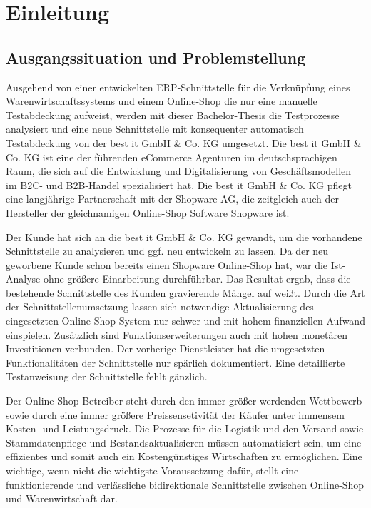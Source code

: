 \section{Einleitung}
\subsection{Ausgangssituation und Problemstellung}
Ausgehend von einer entwickelten ERP-Schnittstelle für die Verknüpfung eines Warenwirtschaftssystems und einem Online-Shop die nur eine manuelle Testabdeckung aufweist, werden mit dieser Bachelor-Thesis die Testprozesse analysiert und eine neue Schnittstelle mit konsequenter automatisch Testabdeckung von der best it GmbH \& Co. KG umgesetzt. Die best it GmbH \& Co. KG ist eine der führenden eCommerce Agenturen im deutschsprachigen Raum, die sich auf die Entwicklung und Digitalisierung von Geschäftsmodellen im B2C- und B2B-Handel spezialisiert hat. Die best it GmbH \& Co. KG pflegt eine langjährige Partnerschaft mit der Shopware AG, die zeitgleich auch der Hersteller der gleichnamigen Online-Shop Software Shopware ist. 

Der Kunde hat sich an die best it GmbH \& Co. KG gewandt, um die vorhandene Schnittstelle zu analysieren und ggf. neu entwickeln zu lassen. Da der neu geworbene Kunde schon bereits einen Shopware Online-Shop hat, war die Ist-Analyse ohne größere Einarbeitung durchführbar. Das Resultat ergab, dass die bestehende Schnittstelle des Kunden gravierende Mängel auf weißt. Durch die Art der Schnittstellenumsetzung lassen sich notwendige Aktualisierung des eingesetzten Online-Shop System nur schwer und mit hohem finanziellen Aufwand einspielen. Zusätzlich sind Funktionserweiterungen auch mit hohen monetären Investitionen verbunden. Der vorherige Dienstleister hat die umgesetzten Funktionalitäten der Schnittstelle nur spärlich dokumentiert. Eine detaillierte Testanweisung der Schnittstelle fehlt gänzlich. 

Der Online-Shop Betreiber steht durch den immer größer werdenden Wettbewerb sowie durch eine immer größere Preissensetivität der Käufer unter immensem Kosten- und Leistungsdruck. Die Prozesse für die Logistik und den Versand sowie Stammdatenpflege und Bestandsaktualisieren müssen automatisiert sein, um eine effizientes und somit auch ein Kostengünstiges Wirtschaften zu ermöglichen. Eine wichtige, wenn nicht die wichtigste Voraussetzung dafür, stellt eine funktionierende und verlässliche bidirektionale Schnittstelle zwischen Online-Shop und Warenwirtschaft dar.

